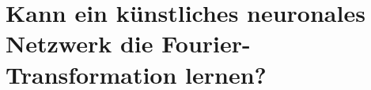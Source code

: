 %
%
%
%
\chapter{Kann ein künstliches neuronales Netzwerk die Fourier-Transformation lernen?\label{chapter:ml}}
\begin{refsection}






\printbibliography[heading=subbibliography]
\end{refsection}
